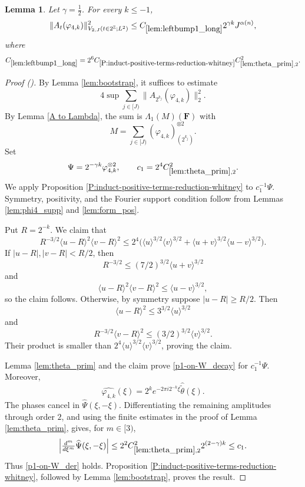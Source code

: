 \documentclass[12pt,reqno]{amsart}
\newcommand{\auto}{{({\tiny\faCar})}}
\theoremstyle{plain}
\newtheorem{lemma}[theorem]{Lemma}
\numberwithin{equation}{section}
\theoremstyle{remark}
\newcommand{\using}[1]{}
\newcommand{\F}{\mathbf{F}}
\begin{document}
\begin{lemma}\label{lem:leftbump1_long}\using{lem:bootstrap}\using{A to Lambda}\using{lem:theta_prim}\using{P:induct-positive-terms-reduction-whitney}\using{lem:phi4_supp}\using{lem:form_pos}
Let $\gamma=\frac12$. For every $k\le-1$,
\begin{equation}\label{auto:left-bump-one-long-bound}
\|A_t(\varphi_{4,k})\|_{V_{2,J}(t\in2^\mathbb Z;L^2)}^2
\le C_{\ref{lem:leftbump1_long}}2^{\gamma k}J^{\alpha(n)},
\end{equation}
where
\begin{equation}\label{auto:left-bump-one-long-constant-definition}
C_{\ref{lem:leftbump1_long}}
=2^6C_{\ref{P:induct-positive-terms-reduction-whitney}}
C_{\ref{lem:theta_prim},2}^2.
\end{equation}
\end{lemma}

\begin{proof}[Proof \auto]
By Lemma \ref{lem:bootstrap}, it suffices to estimate
\[
4\sup\sum_{j\in[J)}\|A_{2^{k_j}}(\varphi_{4,k})\|_2^2.
\]
By Lemma \ref{A to Lambda}, the sum is $\Lambda_1(M)(\F)$ with
\[
M=\sum_{j\in[J)}(\varphi_{4,k})_{(2^{k_j})}^{\otimes2}.
\]
Set
\[
\Psi=2^{-\gamma k}\varphi_{4,k}^{\otimes2},
\qquad
c_1=2^4C_{\ref{lem:theta_prim},2}^2.
\]
We apply Proposition \ref{P:induct-positive-terms-reduction-whitney} to $c_1^{-1}\Psi$. Symmetry, positivity, and the Fourier support condition follow from Lemmas \ref{lem:phi4_supp} and \ref{lem:form_pos}.

Put $R=2^{-k}$. We claim that
\[
R^{-3/2}\langle u-R\rangle^2\langle v-R\rangle^2
\le2^4\bigl(
\langle u\rangle^{3/2}\langle v\rangle^{3/2}
+\langle u+v\rangle^{3/2}\langle u-v\rangle^{3/2}
\bigr).
\]
If $|u-R|,|v-R|<R/2$, then
\[
R^{-3/2}\le(7/2)^{3/2}\langle u+v\rangle^{3/2}
\]
and
\[
\langle u-R\rangle^2\langle v-R\rangle^2
\le\langle u-v\rangle^{3/2},
\]
so the claim follows. Otherwise, by symmetry suppose $|u-R|\ge R/2$. Then
\[
\langle u-R\rangle^2\le3^{3/2}\langle u\rangle^{3/2}
\]
and
\[
R^{-3/2}\langle v-R\rangle^2
\le(3/2)^{3/2}\langle v\rangle^{3/2}.
\]
Their product is smaller than $2^4\langle u\rangle^{3/2}\langle v\rangle^{3/2}$, proving the claim.

Lemma \ref{lem:theta_prim} and the claim prove \eqref{p1-on-W_decay} for $c_1^{-1}\Psi$. Moreover,
\[
\widehat{\varphi_{4,k}}(\xi)
=2^ke^{-2\pi i2^{-k}\xi}\widehat{\widetilde\theta}(\xi).
\]
The phases cancel in $\widehat\Psi(\xi,-\xi)$. Differentiating the remaining amplitudes through order $2$, and using the finite estimates in the proof of Lemma \ref{lem:theta_prim}, gives, for $m\in[3)$,
\[
\left|\tfrac{d^m}{d\xi^m}\widehat\Psi(\xi,-\xi)\right|
\le2^2C_{\ref{lem:theta_prim},2}^2 2^{(2-\gamma)k}
\le c_1.
\]
Thus \eqref{p1-on-W_der} holds. Proposition \ref{P:induct-positive-terms-reduction-whitney}, followed by Lemma \ref{lem:bootstrap}, proves the result.
\end{proof}
\end{document}
